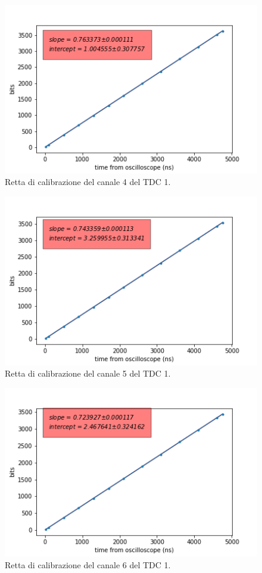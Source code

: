 \begin{figure}[H]
  \centering
  \includegraphics[width=.8\textwidth]{plots/tdc14.png}
  \caption{Retta di calibrazione del canale 4 del TDC 1.}
  \label{fig:tdc14}
\end{figure}

\begin{figure}[H]
  \centering
  \includegraphics[width=.8\textwidth]{plots/tdc15.png}
  \caption{Retta di calibrazione del canale 5 del TDC 1.}
  \label{fig:tdc15}
\end{figure}

\begin{figure}[H]
  \centering
  \includegraphics[width=.8\textwidth]{plots/tdc16.png}
  \caption{Retta di calibrazione del canale 6 del TDC 1.}
  \label{fig:tdc16}
\end{figure}

